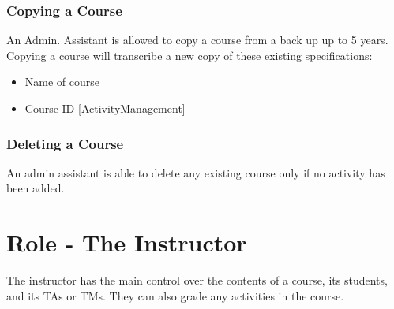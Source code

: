 \documentclass{article}
\begin{document}
\subsubsection{Copying a Course}
An Admin. Assistant is allowed to copy a course from a back up up to 5 years. Copying a course will transcribe
a new copy of these existing specifications:
\begin{itemize}
  \item Name of course
  \item Course ID
    \ref{ActivityManagement}
\end {itemize}

\subsubsection{Deleting a Course}
An admin assistant is able to delete any existing course only if no activity has been added.

\section{Role - The Instructor \label{Instructor}}
The instructor has the main control over the contents of a course, its students, 
and its TAs or TMs. They can also grade any activities in the course.
\end{document}
